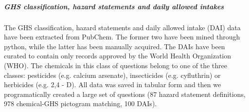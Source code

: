 \subparagraph{GHS classification, hazard statements and daily allowed intakes}

The GHS classification, hazard statements and daily allowed intake (DAI) data have been extracted from PubChem. \cite{pubchem}
The former two have been mined through python, while the latter has been manually acquired.
The DAIs have been curated to contain only records approved by the World Health Organization (WHO). 
The chemicals in this class of questions belong to one of the three classes: pesticides (e.g. calcium arsenate), insecticides (e.g. cyfluthrin) or herbicides (e.g. 2,4 - D). 
All data was saved in tabular form and then we programatically created a large set of questions (87 hazard statement definitions, 978 chemical-GHS pictogram matching, 100 DAIs).

